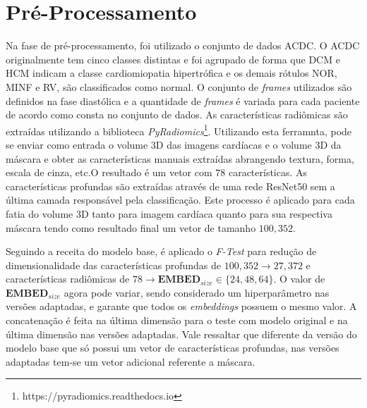 
\section{Pré-Processamento}
\label{subsec:cap4_preprocess}

Na fase de pré-processamento, foi utilizado o conjunto de dados \gls{ACDC}. O \gls{ACDC} originalmente tem cinco classes distintas e foi agrupado de forma que DCM e HCM indicam a classe cardiomiopatia hipertrófica e os demais rótulos NOR, MINF e RV, são classificados como normal. O conjunto de \textit{frames} utilizados são definidos na fase diastólica e a quantidade de \textit{frames} é variada para cada paciente de acordo como consta no conjunto de dados. As características radiômicas são extraídas utilizando a biblioteca \textit{PyRadiomics}\footnote{https://pyradiomics.readthedocs.io}. Utilizando esta ferramnta, pode se enviar como entrada o volume 3D das imagens cardíacas e o volume 3D da máscara e obter as características manuais extraídas abrangendo textura, forma, escala de cinza, etc.O resultado é um vetor com $78$ características. As características profundas são extraídas através de uma rede ResNet50 sem a última camada responsável pela classificação. Este processo é aplicado para cada fatia do volume 3D tanto para imagem cardíaca quanto para sua respectiva máscara tendo como resultado final um vetor de tamanho $100,352$. 

Seguindo a receita do modelo base, é aplicado o \textit{F-Test} para redução de dimensionalidade das características profundas de $100,352 \to 27,372$ e características radiômicas de $78 \to \textbf{EMBED}_{size} \in \{24, 48, 64\}$. O valor de $\textbf{EMBED}_{size}$ agora pode variar, sendo considerado um hiperparâmetro nas versões adaptadas, e garante que todos os \textit{embeddings} possuem o mesmo valor. A concatenação é feita na última dimensão para o teste com modelo original e na última dimensão nas versões adaptadas. Vale ressaltar que diferente da versão do modelo base que só possui um vetor de características profundas, nas versões adaptadas tem-se um vetor adicional referente a máscara. 

